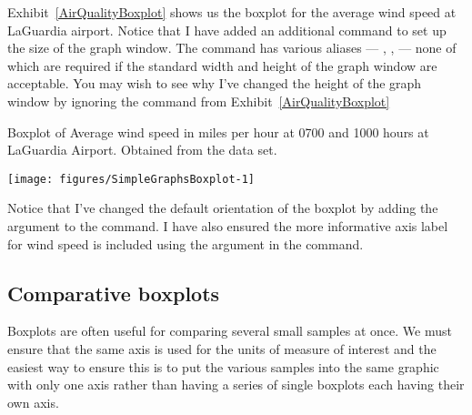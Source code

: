 Exhibit~\ref{AirQualityBoxplot} shows us the boxplot for the average wind speed at LaGuardia airport. Notice that I have added an additional command to set up the size of the graph window. The  command has various aliases --- , ,  --- none of which are required if the standard width and height of the graph window are acceptable. You may wish to see why I've changed the height of the graph window by ignoring the  command from Exhibit~\ref{AirQualityBoxplot} 
 
\begin{exhibit} 
\begin{center} 
\caption{Boxplot of Average wind speed in miles per hour at 0700 and 1000 hours at LaGuardia Airport. Obtained from the  data set.} 
\label{AirQualityBoxplot} 
\begin{knitrout}
\color{fgcolor}
\texttt{[image: figures/SimpleGraphsBoxplot-1]} 

\end{knitrout}
\end{center} 
\end{exhibit} 
 
Notice that I've changed the default orientation of the boxplot by adding the argument  to the  command. I have also ensured the more informative axis label for wind speed is included using the  argument in the command. 
 
\subsection{Comparative boxplots} 
 
Boxplots are often useful for comparing several small samples at once. We must ensure that the same axis is used for the units of measure of interest and the easiest way to ensure this is to put the various samples into the same graphic with only one axis rather than having a series of single boxplots each having their own axis. 
 
